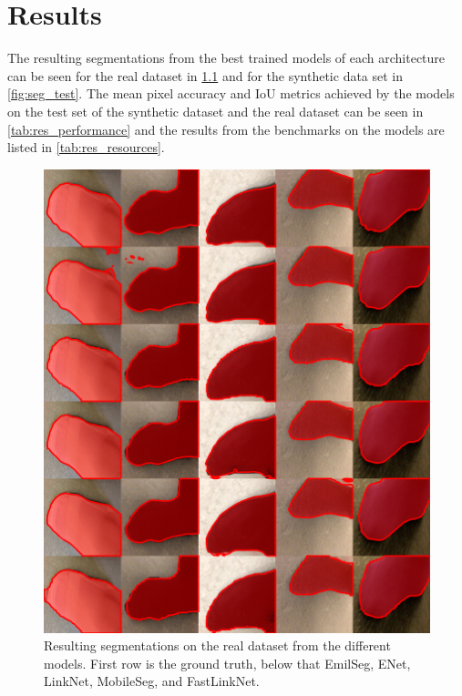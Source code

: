 \documentclass{kththesis}
\begin{document}
\chapter{Results}
The resulting segmentations from the best trained models of each architecture
can be seen for the real dataset in \cref{fig:seg_real} and for the synthetic
data set in \cref{fig:seg_test}. The mean pixel accuracy and IoU metrics
achieved by the models on the test set of the synthetic dataset and the real
dataset can be seen in \cref{tab:res_performance} and the results from the
benchmarks on the models are listed in \cref{tab:res_resources}.
\begin{figure}[h]
  \centering
  \includegraphics[width=\textwidth]{real_color}
  \caption{Resulting segmentations on the real dataset from the different models. First row is the ground
    truth, below that EmilSeg, ENet, LinkNet, MobileSeg, and FastLinkNet.}
  \label{fig:seg_real}
  \end{figure}
\end{document}
